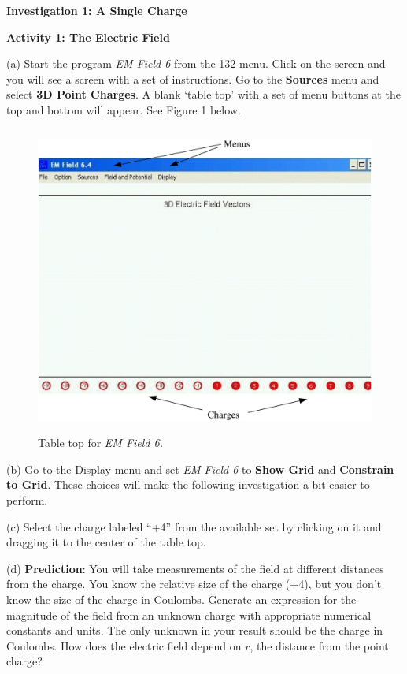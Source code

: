 \textbf{Investigation 1: A Single Charge}

\textbf{Activity 1: The Electric Field}

(a) Start the program {\it EM Field 6} from the 132 menu.
Click on the screen and you will see a screen with a set of
instructions.
Go to the \textbf{Sources} menu and select \textbf{3D Point Charges}.
A blank `table top' with a set of menu 
buttons at the top and bottom will appear. See Figure 1 below.

\begin{figure}[hbt]
\begin{center}
\includegraphics[height=4.0in]{emfield1c.eps}
\caption{Table top for {\it EM Field 6.}}
\end{center}
\end{figure}

(b) Go to the Display menu and set {\it EM Field 6} to
{\bf Show Grid} and {\bf Constrain to Grid}.
These choices will make the following investigation a bit easier to perform.

(c) Select
the charge labeled {}``+4'' from the available set by clicking
on it and dragging it to the center of the table top. 

(d) \textbf{Prediction}: You will take measurements of the field at different
distances from the charge. You know the relative size of the
charge (+4), but you don't know the size of the charge in Coulombs.
Generate an expression for the magnitude of the field from an unknown charge
with appropriate numerical constants and units.
The only unknown in your result should be the charge in Coulombs.
How does the electric field depend on $r$, the distance from the point charge?
\newpage

